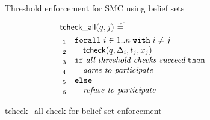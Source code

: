 \documentclass[10pt]{sigplanconf}
\newcommand{\kw}[1]{\mathtt{#1}}
\newcommand{\polc}{\textsf{tcheck}}
\newcommand{\polcall}{\textsf{tcheck\_all}}
\begin{document}
\begin{figure}
\caption{Threshold enforcement for SMC using belief sets}
\label{fig:smc-sets}
\end{figure}

\begin{figure}[t]
\[
\begin{array}{l}
\polcall(q, j) \defeq \\
\\[-2ex]
~_1\quad \kw{forall}\;i \in 1..n\;\kw{with}\; i \not= j \\
~_2\quad\quad \polc(q,\Delta_i,t_j,x_j) \\
~_3\quad\kw{if}\; \emph{all threshold checks succeed}\; \kw{then} \\
~_4\quad\quad \emph{agree to participate} \\
~_5\quad\kw{else} \\
~_6\quad\quad \emph{refuse to participate} \\
\end{array}
\]
\caption{\polcall{} check for belief set enforcement}
\label{alg:belief-set-check}
\end{figure}
\end{document}
